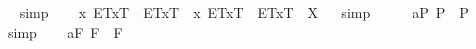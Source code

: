 \begin{isabellebody}
\isadelimproof
\ %
\endisadelimproof
%
\isatagproof
{}\isamarkupfalse%
\ simp\ \isamarkupfalse%
%
\endisatagproof
{\isafoldproof}%
%
\isadelimproof
%
\endisadelimproof
\isanewline
\ \isamarkupfalse%
\ {\isachardoublequoteopen}\isactrlbold {\isasymdiamond}{\isacharparenleft}\isactrlbold {\isasymexists}x{\isachardot}\ {\isasymlparr}E\isactrlsup T{\isacharcomma}x\isactrlsup T{\isasymrparr}\ \isactrlbold {\isasymand}\ \isactrlbold {\isasymdiamond}{\isacharparenleft}\isactrlbold {\isasymnot}{\isasymlparr}E\isactrlsup T{\isacharcomma}x\isactrlsup T{\isasymrparr}{\isacharparenright}{\isacharparenright}\ \isactrlbold {\isasymand}\ \isactrlbold {\isasymdiamond}{\isacharparenleft}\isactrlbold {\isasymnot}{\isacharparenleft}\isactrlbold {\isasymexists}x{\isachardot}\ {\isasymlparr}E\isactrlsup T{\isacharcomma}x\isactrlsup T{\isasymrparr}\ \isactrlbold {\isasymand}\ \isactrlbold {\isasymdiamond}{\isacharparenleft}\isactrlbold {\isasymnot}{\isasymlparr}E\isactrlsup T{\isacharcomma}x\isactrlsup T{\isasymrparr}{\isacharparenright}{\isacharparenright}{\isacharparenright}\ {\isacharequal}\ X{\isachardoublequoteclose}%
\isadelimproof
\ %
\endisadelimproof
%
\isatagproof
{}\isamarkupfalse%
\ simp\ \isamarkupfalse%
\ %
%
\endisatagproof
{\isafoldproof}%
%
\isadelimproof
%
\endisadelimproof
%
\isamarkuptrue%
\ \isamarkupfalse%
\ a{}{}{\isacharunderscore}{}{\isacharunderscore}P{\isacharcolon}\ {\isachardoublequoteopen}{\isacharbrackleft}\isactrlbold {\isasymA}{\isasymphi}\isactrlsup P\ \isactrlbold {\isasymrightarrow}\ \isactrlbold {\isasymbox}\isactrlbold {\isasymA}{\isasymphi}\isactrlsup P{\isacharbrackright}\ {\isacharequal}\ {\isasymtop}{\isachardoublequoteclose}%
\isadelimproof
\ %
\endisadelimproof
%
\isatagproof
{}\isamarkupfalse%
\ simp\ \isamarkupfalse%
%
\endisatagproof
{\isafoldproof}%
%
\isadelimproof
%
\endisadelimproof
\isanewline
\ \isamarkupfalse%
\ a{}{}{\isacharunderscore}{}{\isacharunderscore}F{\isacharcolon}\ {\isachardoublequoteopen}{\isacharbrackleft}\isactrlbold {\isasymA}{\isasymphi}\isactrlsup F\ \isactrlbold {\isasymrightarrow}\ \isactrlbold {\isasymbox}\isactrlbold {\isasymA}{\isasymphi}\isactrlsup F{\isacharbrackright}\ {\isacharequal}\ {\isasymtop}{\isachardoublequoteclose}%

\end{isabellebody}
